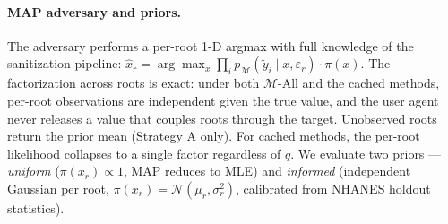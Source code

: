 \paragraph{MAP adversary and priors.} The adversary performs a per-root 1-D argmax with full knowledge of the sanitization pipeline: $\hat{x}_r = \arg\max_x \prod_i p_{\mathcal{M}}(\tilde{y}_i \mid x, \varepsilon_r) \cdot \pi(x)$. The factorization across roots is exact: under both $\mathcal{M}$-All and the cached methods, per-root observations are independent given the true value, and the user agent never releases a value that couples roots through the target. Unobserved roots return the prior mean (Strategy A only). For cached methods, the per-root likelihood collapses to a single factor regardless of $q$. We evaluate two priors --- \emph{uniform} ($\pi(x_r) \propto 1$, MAP reduces to MLE) and \emph{informed} (independent Gaussian per root, $\pi(x_r) = \mathcal{N}(\mu_r, \sigma_r^2)$, calibrated from NHANES holdout statistics).






